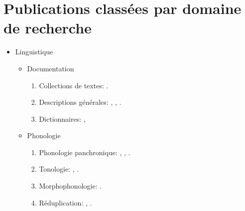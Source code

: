 \documentclass[oneside,a4paper,11pt]{article}
\newcommand{\langue}[2]{#2}
\begin{document}
\section{\langue{By topics}{Publications classées par domaine de recherche}}
\begin{itemize}
\item  \langue{Linguistics}{Linguistique} 
\begin{itemize}
\item  Documentation
\begin{enumerate}
\item  \langue{Text collections}{Collections de textes}: \citet{jacques10gesar}.
\item \langue{General descriptions}{Descriptions générales}: \citet{jacques04these}, \citet{jacques08}, \citet{jacques17sketch}.
\item \langue{Dictionaries}{Dictionnaires}: \citet{jacques15japhug}, \citet{jacques15khaling}
\end{enumerate}


\item \langue{Phonology}{Phonologie}
\begin{enumerate}
\item  \langue{Panchronic Phonology}{Phonologie panchronique}:  \citet{jacques11lingua}, \citet{michaud-jacques12nasalite},     \citet{jacques13arapaho}.
\item   \langue{Tonology}{Tonologie}: \citet{jacques11pumi.tone}, \citet{jacques16tonogenesis}.
\item \langue{Morphophonology}{Morphophonologie}: \citet{jacques12khaling}.
\item \langue{Reduplication}{Réduplication}:  \citet{jacques04redupl},  \citet{jacques07redupl}.
\end{enumerate}


\end{itemize}
\end{itemize}
\end{document}
